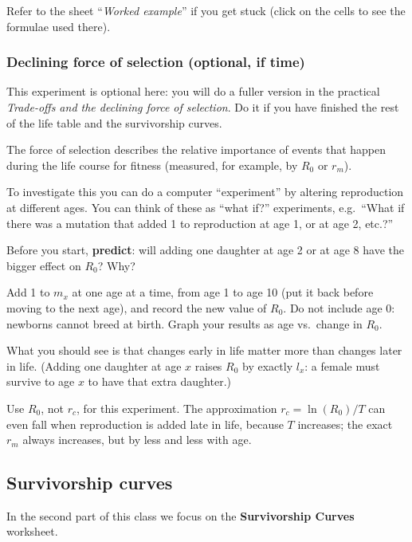 \documentclass[
  a4paper]{book}
\begin{document}
Refer to the sheet ``\emph{Worked example}'' if you get stuck (click on the cells to see the formulae used there).

\subsubsection{Declining force of selection (optional, if time)}\label{declining-force-of-selection-optional-if-time}

This experiment is optional here: you will do a fuller version in the practical \emph{Trade-offs and the declining force of selection}. Do it if you have finished the rest of the life table and the survivorship curves.

The force of selection describes the relative importance of events that happen during the life course for fitness (measured, for example, by \(R_0\) or \(r_m\)).

To investigate this you can do a computer ``experiment'' by altering reproduction at different ages. You can think of these as ``what if?'' experiments, e.g.~``What if there was a mutation that added 1 to reproduction at age 1, or at age 2, etc.?''

Before you start, \textbf{predict}: will adding one daughter at age 2 or at age 8 have the bigger effect on \(R_0\)? Why?

Add 1 to \(m_x\) at one age at a time, from age 1 to age 10 (put it back before moving to the next age), and record the new value of \(R_0\). Do not include age 0: newborns cannot breed at birth. Graph your results as age vs.~change in \(R_0\).

What you should see is that changes early in life matter more than changes later in life. (Adding one daughter at age \(x\) raises \(R_0\) by exactly \(l_x\): a female must survive to age \(x\) to have that extra daughter.)

Use \(R_0\), not \(r_c\), for this experiment. The approximation \(r_c = \ln(R_0)/T\) can even fall when reproduction is added late in life, because \(T\) increases; the exact \(r_m\) always increases, but by less and less with age.

\subsection{Survivorship curves}\label{survivorship-curves}

In the second part of this class we focus on the \textbf{Survivorship Curves} worksheet.
\end{document}
